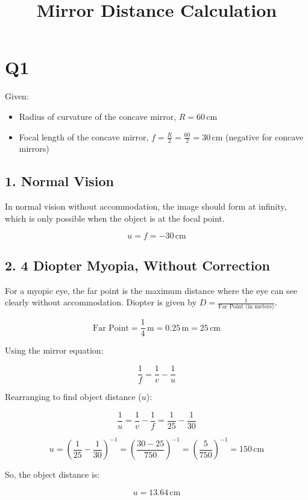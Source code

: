 \documentclass{article}
\begin{document}
\title{Mirror Distance Calculation}
\author{}
\date{}
\maketitle

\section*{Q1}

Given:
\begin{itemize}
    \item Radius of curvature of the concave mirror, $R = 60 \, \text{cm}$
    \item Focal length of the concave mirror, $f = \frac{R}{2} = \frac{60}{2} = 30 \, \text{cm}$ (negative for concave mirrors)
\end{itemize}

\subsection*{1. Normal Vision}
In normal vision without accommodation, the image should form at infinity, which is only possible when the object is at the focal point.

\[
u = f = -30 \, \text{cm}
\]

\subsection*{2. 4 Diopter Myopia, Without Correction}
For a myopic eye, the far point is the maximum distance where the eye can see clearly without accommodation. Diopter is given by $D = \frac{1}{\text{Far Point (in meters)}}$.

\[
\text{Far Point} = \frac{1}{4} \, \text{m} = 0.25 \, \text{m} = 25 \, \text{cm}
\]

Using the mirror equation:

\[
\frac{1}{f} = \frac{1}{v} - \frac{1}{u}
\]

Rearranging to find object distance ($u$):

\[
\frac{1}{u} = \frac{1}{v} - \frac{1}{f} = \frac{1}{25} - \frac{1}{30}
\]

\[
u = \left( \frac{1}{25} - \frac{1}{30} \right)^{-1} = \left( \frac{30 - 25}{750} \right)^{-1} = \left( \frac{5}{750} \right)^{-1} = 150 \, \text{cm}
\]

So, the object distance is:

\[
u = 13.64 \, \text{cm}
\]
\end{document}
